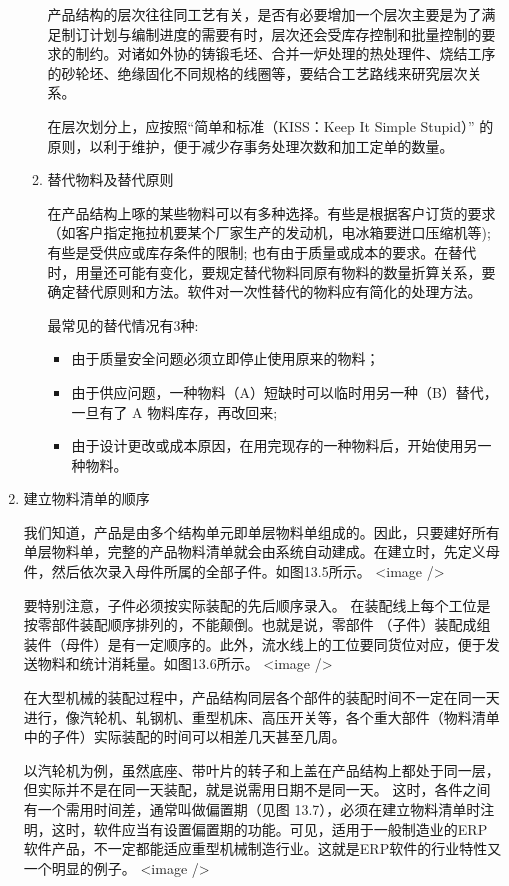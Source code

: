 \begin{enumerate}
\begin{enumerate}
        产品结构的层次往往同工艺有关，是否有必要增加一个层次主要是为了满足制订计划与编制进度的需要有时，层次还会受库存控制和批量控制的要求的制约。对诸如外协的铸锻毛坯、合并一炉处理的热处理件、烧结工序的砂轮坯、绝缘固化不同规格的线圈等，要结合工艺路线来研究层次关系。

        在层次划分上，应按照“简单和标准（KISS：Keep It Simple Stupid）” 的原则，以利于维护，便于减少存事务处理次数和加工定单的数量。

        \item  替代物料及替代原则

        在产品结构上啄的某些物料可以有多种选择。有些是根据客户订货的要求（如客户指定拖拉机要某个厂家生产的发动机，电冰箱要迸口压缩机等);有些是受供应或库存条件的限制; 也有由于质量或成本的要求。在替代时，用量还可能有变化，要规定替代物料同原有物料的数量折算关系，要确定替代原则和方法。软件对一次性替代的物料应有简化的处理方法。

        最常见的替代情况有3种:
            \begin{itemize}
            \item 由于质量安全问题必须立即停止使用原来的物料；
            \item 由于供应问题，一种物料（A）短缺时可以临时用另一种（B）替代，一旦有了 A 物料库存，再改回来;
            \item 由于设计更改或成本原因，在用完现存的一种物料后，开始使用另一种物料。
            \end{itemize}

        \end{enumerate}

    \item 建立物料清单的顺序

        我们知道，产品是由多个结构单元即单层物料单组成的。因此，只要建好所有单层物料单，完整的产品物料清单就会由系统自动建成。在建立时，先定义母件，然后依次录入母件所属的全部子件。如图13.5所示。
        <image />

        要特别注意，子件必须按实际装配的先后顺序录入。 在装配线上每个工位是按零部件装配顺序排列的，不能颠倒。也就是说，零部件 （子件）装配成组装件（母件）是有一定顺序的。此外，流水线上的工位要同货位对应，便于发送物料和统计消耗量。如图13.6所示。
        <image />

        在大型机械的装配过程中，产品结构同层各个部件的装配时间不一定在同一天进行，像汽轮机、轧钢机、重型机床、高压开关等，各个重大部件（物料清单中的子件）实际装配的时间可以相差几天甚至几周。

        以汽轮机为例，虽然底座、带叶片的转子和上盖在产品结构上都处于同一层，但实际并不是在同一天装配，就是说需用日期不是同一天。 这时，各件之间有一个需用时间差，通常叫做偏置期（见图 13.7），必须在建立物料清单时注明，这时，软件应当有设置偏置期的功能。可见，适用于一般制造业的ERP 软件产品，不一定都能适应重型机械制造行业。这就是ERP软件的行业特性又一个明显的例子。
        <image />


\end{enumerate}
